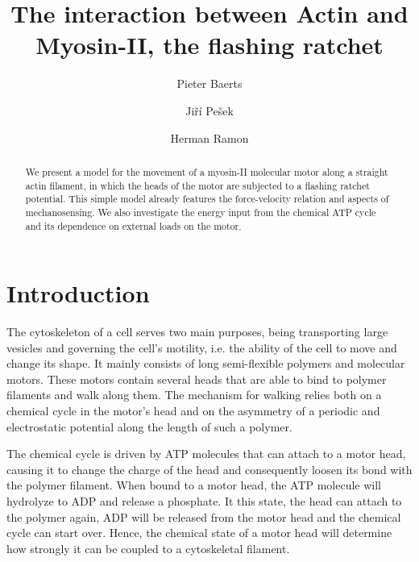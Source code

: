 \documentclass[aps,pre,twocolumn,showpacs,showkeys]{revtex4-1}
\begin{document}
 

\title{The interaction between Actin and Myosin-II, the flashing ratchet}
\author{Pieter Baerts}
\author{Jiří Pešek}
\author{Herman Ramon}

\begin{abstract}
We present a model for the movement of a myosin-II molecular motor along a straight actin filament, in which the heads of the motor are subjected to a flashing ratchet potential. This simple model already features the force-velocity relation and aspects of mechanosensing. We also investigate the energy input from the chemical ATP cycle and its dependence on external loads on the motor.  
\end{abstract}

\maketitle 

\section{Introduction}

The cytoskeleton of a cell serves two main purposes, being transporting large vesicles and governing the cell's motility, i.e. the ability of the cell to move and change its shape. 
It mainly consists of long semi-flexible polymers and molecular motors. 
These motors contain several heads that are able to bind to polymer filaments and walk along them. 
The mechanism for walking relies both on a chemical cycle in the motor's head and on the asymmetry of a periodic and electrostatic potential along the length of such a polymer.


The chemical cycle is driven by ATP molecules that can attach to a motor head, causing it to change the charge of the head and consequently loosen its bond with the polymer filament. 
When bound to a motor head, the ATP molecule will hydrolyze to ADP and release a phosphate. 
It this state, the head can attach to the polymer again, ADP will be released from the motor head and the chemical cycle can start over. 
Hence, the chemical state of a motor head will determine how strongly it can be coupled to a cytoskeletal filament. 
\end{document}
